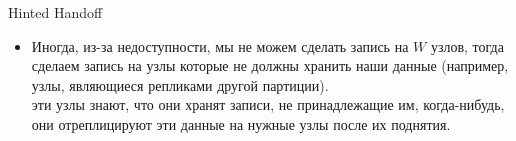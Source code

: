   \begin{definition}
    Hinted Handoff
  \end{definition}
  \begin{itemize}
    \item Иногда, из-за недоступности, мы не можем сделать запись на $W$ узлов, тогда сделаем запись на узлы которые не должны хранить наши данные (например, узлы, являющиеся репликами другой партиции). \\
    эти узлы знают, что они хранят записи, не принадлежащие им, когда-нибудь, они отреплицируют эти данные на нужные узлы после их поднятия.
  \end{itemize}
